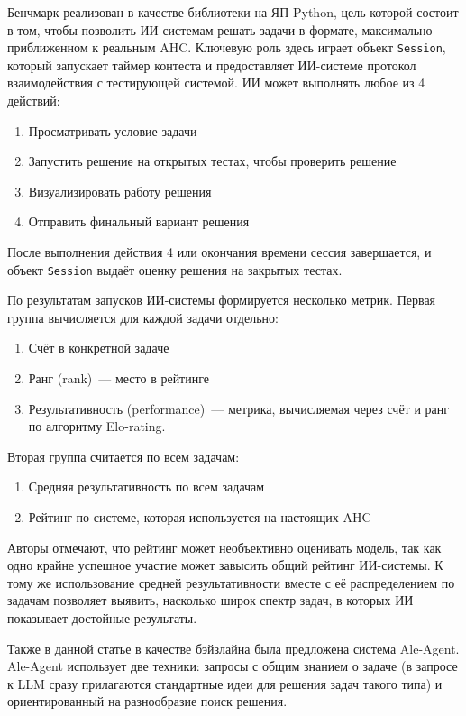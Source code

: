 \documentclass[a4paper,14pt]{extarticle}
\begin{document}
    Бенчмарк реализован в качестве библиотеки на ЯП Python, цель которой состоит в том, чтобы позволить ИИ-системам решать задачи в формате, максимально приближенном к реальным AHC.
    Ключевую роль здесь играет объект \texttt{Session}, который запускает таймер контеста и предоставляет ИИ-системе протокол взаимодействия с тестирующей системой.
    ИИ может выполнять любое из 4 действий:
    \begin{enumerate}
        \item Просматривать условие задачи
        \item Запустить решение на открытых тестах, чтобы проверить решение
        \item Визуализировать работу решения
        \item Отправить финальный вариант решения
    \end{enumerate}
    После выполнения действия 4 или окончания времени сессия завершается, и объект \texttt{Session} выдаёт оценку решения на закрытых тестах.

    По результатам запусков ИИ-системы формируется несколько метрик.
    Первая группа вычисляется для каждой задачи отдельно:
    \begin{enumerate}
        \item Счёт в конкретной задаче 
        \item Ранг (rank)~--- место в рейтинге
        \item Результативность (performance)~--- метрика, вычисляемая через счёт и ранг по алгоритму Elo-rating.
    \end{enumerate}
    Вторая группа считается по всем задачам:
    \begin{enumerate}
        \item Средняя результативность по всем задачам 
        \item Рейтинг по системе, которая используется на настоящих AHC
    \end{enumerate}
    Авторы отмечают, что рейтинг может необъективно оценивать модель, так как одно крайне успешное участие может завысить общий рейтинг ИИ-системы.
    К тому же использование средней результативности вместе с её распределением по задачам позволяет выявить, насколько широк спектр задач, в которых ИИ показывает достойные результаты.

    Также в данной статье в качестве бэйзлайна была предложена система Ale-Agent.
    Ale-Agent использует две техники: запросы с общим знанием о задаче (в запросе к LLM сразу прилагаются стандартные идеи для решения задач такого типа) и ориентированный на разнообразие поиск решения.
\end{document}
